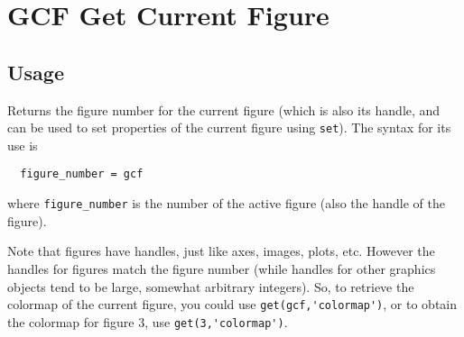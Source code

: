 \section{GCF Get Current Figure}

\subsection{Usage}

Returns the figure number for the current figure (which is also its handle,
and can be used to set properties of the current figure using \verb|set|).  
The syntax for its use
is
\begin{verbatim}
  figure_number = gcf
\end{verbatim}
where \verb|figure_number| is the number of the active figure (also the handle of
the figure).

Note that figures have handles, just like axes, images, plots, etc.  However
the handles for figures match the figure number (while handles for other 
graphics objects tend to be large, somewhat arbitrary integers).  So, to 
retrieve the colormap of the current figure, you could 
use \verb|get(gcf,'colormap')|, or to obtain the colormap for figure 3, 
use \verb|get(3,'colormap')|.
